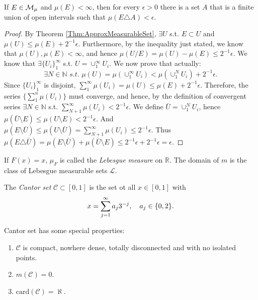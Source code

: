 \begin{exc}
    If $E\in\mathcal{M}_{\mu}$ and $\mu(E)<\infty$, then for every 
    $\epsilon>0$ there is a set $A$ that is a finite union of open 
    intervals such that $\mu(E\triangle A)<\epsilon$.
\end{exc}
\begin{proof}
    By Theorem \ref{Thm:ApproxMeasurableSet}, $\exists U$ s.t. $E\subset U$
    and $\mu(U)\leq\mu(E)+2^{-1}\epsilon$. Furthermore, by the
    inequality just stated, we know that $\mu(U),\mu(E)<\infty$, and hence 
    $\mu(U/E)=\mu(U)-\mu(E)\leq 2^{-1}\epsilon$. We know that $\exists 
    \{U_i\}_1^{\infty}$
    s.t. $U=\cup_1^{\infty}U_i$. We now prove that actually:
    \begin{displaymath}
        \exists N\in\mathbb{N}\textit{ s.t. }\mu(U)=\mu(\cup_1^{\infty}U_i)
        <\mu(\cup_1^{N}U_i)+2^{-1}\epsilon.
    \end{displaymath}
    Since $\{U_i\}_1^{\infty}$ is disjoint, $\sum_1^{\infty}\mu(U_i)=\mu(U)
    \leq\mu(E)+2^{-1}\epsilon$. Therefore, the series $\{\sum_1^{n}\mu(U_i)\}$
    must converge, and hence, by the definition of convergent series $\exists
    N\in\mathbb{N}$ s.t. $\sum_{N+1}^{\infty}\mu(U_i)<2^{-1}\epsilon$. We define
    $\bar{U}=\cup_1^{N}U_i$, hence $\mu(\bar{U}\setminus E)
    \leq\mu(U\setminus E)<2^{-1}\epsilon$. 
    And $\mu(E\setminus\bar{U})\leq\mu(U\setminus\bar{U})=
    \sum_{N+1}^{\infty}\mu(U_i)\leq2^{-1}\epsilon$.
    Thus $\mu(E\triangle\bar{U})=\mu(E\setminus\bar{U})+
    \mu(\bar{U}\setminus E)\leq2^{-1}\epsilon+2^{-1}\epsilon=\epsilon$.
\end{proof}
\begin{defn}
    If $F(x)=x$, $\mu_{F}$ is called the \textit{Lebesgue measure }on 
    $\mathbb{R}$. The domain of $m$ is the class of Lebesgue 
    measurable sets $\mathcal{L}$.
\end{defn}
\begin{defn}
    The \textit{Cantor set }$\mathcal{C}\subset[0,1]$ is the 
    set ot all $x\in[0,1]$ with 
    \begin{displaymath}
        x=\sum_{j=1}^{\infty}a_j3^{-j},\quad a_j\in\{0,2\}.
    \end{displaymath}
\end{defn}
\begin{prop}
    \label{Prop:PropertiesOfCantorSet}
    Cantor set has some special properties:
    \begin{enumerate}
        \item $\mathcal{C}$ is compact, nowhere dense, 
        totally disconnected and with no isolated points.
        \item $m(\mathcal{C})=0$.
        \item $\text{card}(\mathcal{C})=\aleph$.
    \end{enumerate}
\end{prop}
